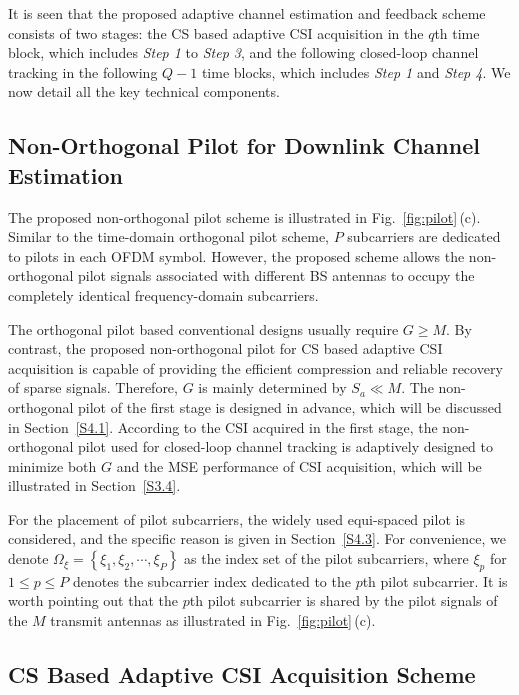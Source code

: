 \documentclass[final]{IEEEtran}
\begin{document}
 It is seen that the proposed adaptive channel estimation and feedback scheme consists
 of two stages: the CS based adaptive CSI acquisition in the $q$th time block, which
 includes \emph{Step 1} to \emph{Step 3}, and the following closed-loop channel tracking in
 the following $Q-1$ time blocks, which includes \emph{Step 1} and \emph{Step 4}. We now
 detail all the key technical components.

\subsection{Non-Orthogonal Pilot for Downlink Channel Estimation}\label{non-orthogonal}

 The proposed non-orthogonal pilot scheme is illustrated in Fig.~\ref{fig:pilot}\,(c).
 Similar to the time-domain orthogonal pilot scheme, $P$ subcarriers are dedicated to
 pilots in each OFDM symbol. However, the proposed scheme allows the non-orthogonal pilot
 signals associated with different BS antennas to occupy the completely identical
 frequency-domain subcarriers.

 The orthogonal pilot based conventional designs usually require $G\ge M$. By contrast,
 the proposed non-orthogonal pilot for CS based adaptive CSI acquisition is capable of
 providing the efficient compression and reliable recovery of sparse signals. Therefore,
 $G$ is mainly determined by $S_a \ll M$. The non-orthogonal pilot of the first stage is
 designed in advance, which will be discussed in Section~\ref{S4.1}. According to the
 CSI acquired in the first stage, the non-orthogonal pilot used for closed-loop channel
 tracking is adaptively designed to minimize both $G$ and the MSE performance of CSI
 acquisition, which will be illustrated in Section~\ref{S3.4}.

 For the placement of pilot subcarriers, the widely used equi-spaced pilot is considered,
 and the specific reason is given in Section~\ref{S4.3}. For convenience, we denote
 $\Omega_{\xi}=\left\{ \xi_1,\xi_2,\cdots ,\xi_{P}\right\}$ as the index set of the
 pilot subcarriers, where $\xi_p$ for $1 \le p \le P$ denotes the subcarrier index
 dedicated to the $p$th pilot subcarrier. It is worth pointing out that the $p$th pilot
 subcarrier is shared by the pilot signals of the $M$ transmit antennas as illustrated
 in Fig.~\ref{fig:pilot}\,(c).

\subsection{CS Based Adaptive CSI Acquisition Scheme}\label{CSI acquisition}
\end{document}
